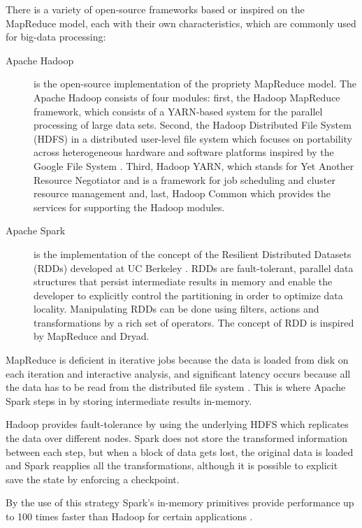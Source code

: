 There is a variety of open-source frameworks based or inspired on the MapReduce model, each with their own characteristics, which are commonly used for big-data processing:
\begin{description}
    \item[Apache Hadoop] is the open-source implementation of the propriety MapReduce model. The Apache Hadoop consists of four modules: first, the Hadoop MapReduce framework, which consists of a YARN-based system for the parallel processing of large data sets. Second, the Hadoop Distributed File System (HDFS) in a distributed user-level file system which focuses on portability across heterogeneous hardware and software platforms \cite{5452045} inspired by the Google File System \cite{Ghemawat:2003:GFS:1165389.945450}. Third, Hadoop YARN, which stands for Yet Another Resource Negotiator and is a framework for job scheduling and cluster resource management \cite{Vavilapalli:2013:AHY:2523616.2523633} and, last, Hadoop Common which provides the services for supporting the Hadoop modules.
    \item[Apache Spark] is the implementation of the concept of the Resilient Distributed Datasets (RDDs) developed at UC Berkeley \cite{180560}. RDDs are fault-tolerant, parallel data structures that persist intermediate results in memory and enable the developer to explicitly control the partitioning in order to optimize data locality. Manipulating RDDs can be done using filters, actions and transformations by a rich set of operators. The concept of RDD is inspired by MapReduce and Dryad.
\end{description}

MapReduce is deficient in iterative jobs because the data is loaded from disk on each iteration and interactive analysis, and significant latency occurs because all the data has to be read from the distributed file system \cite{Zaharia:2010:SCC:1863103.1863113}. This is where Apache Spark steps in by storing intermediate results in-memory.

Hadoop provides fault-tolerance by using the underlying HDFS which replicates the data over different nodes. Spark does not store the transformed information between each step, but when a block of data gets lost, the original data is loaded and Spark reapplies all the transformations, although it is possible to explicit save the state by enforcing a checkpoint.

By the use of this strategy Spark's in-memory primitives provide performance up to 100 times faster than Hadoop for certain applications \cite{Xin:2013:SSR:2463676.2465288}.